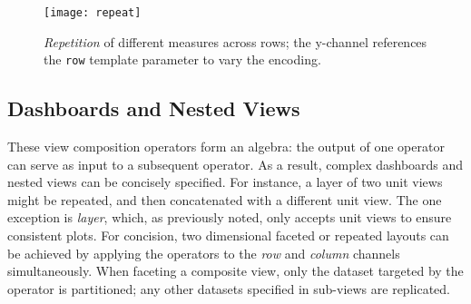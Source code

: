 \begin{figure*}[h!]
  \centering
  \texttt{[image: repeat]}
  \caption{\emph{Repetition} of different measures across rows; the y-channel
  references the \texttt{row} template parameter to vary the encoding.}
  \label{fig:vl:repeat}
\end{figure*}

\subsection{Dashboards and Nested Views}

\vspace{-7pt}

These view composition operators form an algebra: the output of one operator can
serve as input to a subsequent operator. As a result, complex dashboards and
nested views can be concisely specified. For instance, a layer of two unit views
might be repeated, and then concatenated with a different unit view. The one
exception is \emph{layer}, which, as previously noted, only accepts unit views
to ensure consistent plots. For concision, two dimensional faceted or repeated
layouts can be achieved by applying the operators to the \emph{row} and
\emph{column} channels simultaneously. When faceting a composite view, only the
dataset targeted by the operator is partitioned; any other datasets specified in
sub-views are replicated.